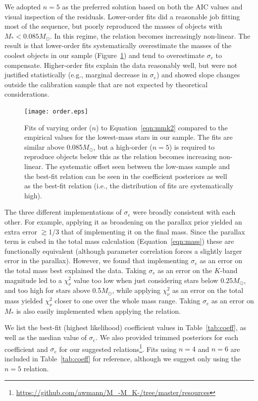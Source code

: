 \documentclass[twocolumn]{aastex62}
\newcommand{\order}{5}
\begin{document}
We adopted $n=\order$ as the preferred solution based on both the AIC values and visual inspection of the residuals. Lower-order fits did a reasonable job fitting most of the sequence, but poorly reproduced the masses of objects with $M_*<0.085M_\odot$. In this regime, the relation becomes increasingly non-linear. The result is that lower-order fits systematically overestimate the masses of the coolest objects in our sample (Figure~\ref{fig:order}) and tend to overestimate $\sigma_e$ to compensate. Higher-order fits explain the data reasonably well, but were not justified statistically (e.g., marginal decrease in $\sigma_e$) and showed slope changes outside the calibration sample that are not expected by theoretical considerations. 

\begin{figure}[h]
\begin{center}
\texttt{[image: order.eps]}
\caption{Fits of varying order ($n$) to Equation~\ref{eqn:mmk2} compared to the empirical values for the lowest-mass stars in our sample. The fits are similar above 0.085$M_\odot$, but a high-order ($n=\order$) is required to reproduce objects below this as the relation becomes increasing non-linear. The systematic offset seen between the low-mass sample and the best-fit relation can be seen in the coefficient posteriors as well as the best-fit relation (i.e., the distribution of fits are systematically high). }
\label{fig:order}
\end{center}
\end{figure}

The three different implementations of $\sigma_e$ were broadly consistent with each other. For example, applying it as broadening on the parallax prior yielded an extra error $\gtrsim$1/3 that of implementing it on the final mass. Since the parallax term is cubed in the total mass calculation (Equation~\ref{eqn:mass}) these are functionally equivalent (although parameter correlation forces a slightly larger error in the parallax). However, we found that implementing $\sigma_e$ as an error on the total mass best explained the data. Taking $\sigma_e$ as an error on the $K$-band magnitude led to a $\chi^2_\nu$ value too low when just considering stars below 0.25$M_\odot$, and too high for stars above 0.5$M_\odot$, while applying $\chi^2_\nu$ as an error on the total mass yielded $\chi^2_\nu$ closer to one over the whole mass range. Taking $\sigma_e$ as an error on $M_*$ is also easily implemented when applying the relation. 

We list the best-fit (highest likelihood) coefficient values in Table~\ref{tab:coeff}, as well as the median value of $\sigma_e$. We also provided trimmed posteriors for each coefficient and $\sigma_e$ for our suggested relations\footnote{\href{https://github.com/awmann/M_-M_K-/tree/master/resources}{https://github.com/awmann/M\_-M\_K-/tree/master/resources}}. Fits using $n=4$ and $n=6$ are included in Table~\ref{tab:coeff} for reference, although we suggest only using the $n=\order$ relation. 
\end{document}
